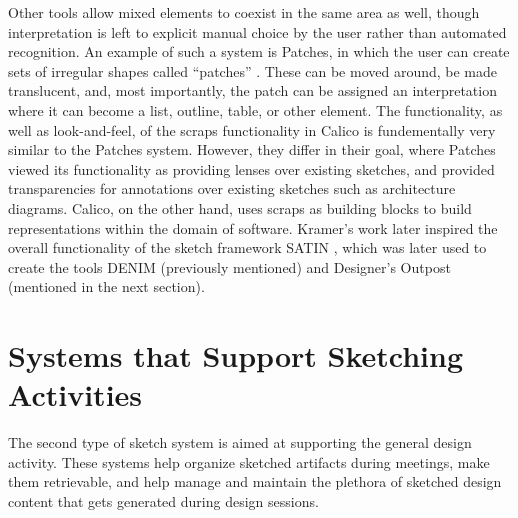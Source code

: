 \documentclass[12pt,fleqn]{ucithesis}
\begin{document}
Other tools allow mixed elements to coexist in the same area as well, though interpretation is left to explicit manual choice by the user rather than automated recognition. An example of such a system is Patches, in which the user can create sets of irregular shapes called ``patches'' \citep{Kramer}. These can be moved around, be made translucent, and, most importantly, the patch can be assigned an interpretation where it can become a list, outline, table, or other element. The functionality, as well as look-and-feel, of the scraps functionality in Calico is fundementally very similar to the Patches system. However, they differ in their goal, where Patches viewed its functionality as providing lenses over existing sketches, and provided transparencies for annotations over existing sketches such as architecture diagrams. Calico, on the other hand, uses scraps as building blocks to build representations within the domain of software. Kramer's work later inspired the overall functionality of the sketch framework SATIN \citep{Hong}, which was later used to create the tools DENIM (previously mentioned) and Designer's Outpost (mentioned in the next section). 

\section{Systems that Support Sketching Activities}
\label{relatedwork:2}

The second type of sketch system is aimed at supporting the general design activity. These systems help organize sketched artifacts during meetings, make them retrievable, and help manage and maintain the plethora of sketched design content that gets generated during design sessions. 
\end{document}
